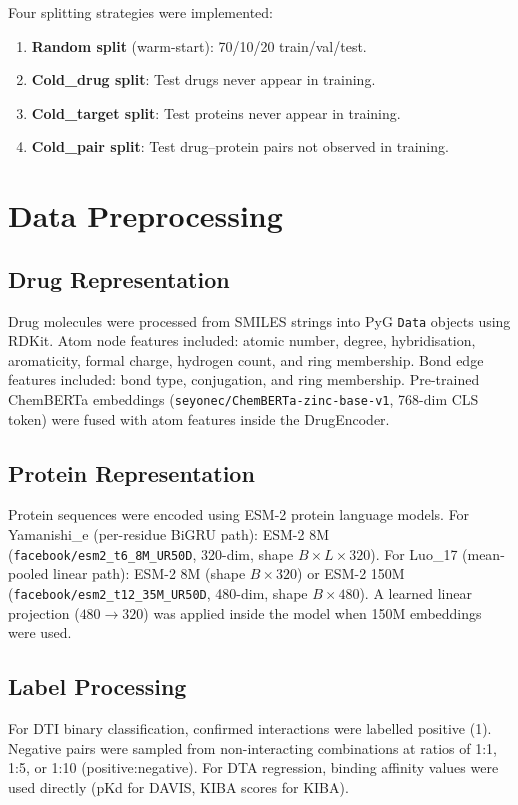 \documentclass[12pt,a4paper,oneside]{report}
\begin{document}
Four splitting strategies were implemented:
\begin{enumerate}[leftmargin=1.5em]
  \item \textbf{Random split} (warm-start): 70/10/20 train/val/test.
  \item \textbf{Cold\_drug split}: Test drugs never appear in training.
  \item \textbf{Cold\_target split}: Test proteins never appear in training.
  \item \textbf{Cold\_pair split}: Test drug--protein pairs not observed in training.
\end{enumerate}

\section{Data Preprocessing}

\subsection{Drug Representation}
Drug molecules were processed from SMILES strings into PyG \texttt{Data} objects using RDKit. Atom node features included: atomic number, degree, hybridisation, aromaticity, formal charge, hydrogen count, and ring membership. Bond edge features included: bond type, conjugation, and ring membership. Pre-trained ChemBERTa embeddings (\texttt{seyonec/ChemBERTa-zinc-base-v1}, 768-dim CLS token) were fused with atom features inside the DrugEncoder.

\subsection{Protein Representation}
Protein sequences were encoded using ESM-2 protein language models. For Yamanishi\_e (per-residue BiGRU path): ESM-2 8M (\texttt{facebook/esm2\_t6\_8M\_UR50D}, 320-dim, shape $B \times L \times 320$). For Luo\_17 (mean-pooled linear path): ESM-2 8M (shape $B \times 320$) or ESM-2 150M (\texttt{facebook/esm2\_t12\_35M\_UR50D}, 480-dim, shape $B \times 480$). A learned linear projection ($480 \to 320$) was applied inside the model when 150M embeddings were used.

\subsection{Label Processing}
For DTI binary classification, confirmed interactions were labelled positive (1). Negative pairs were sampled from non-interacting combinations at ratios of 1:1, 1:5, or 1:10 (positive:negative). For DTA regression, binding affinity values were used directly (pKd for DAVIS, KIBA scores for KIBA).
\end{document}
